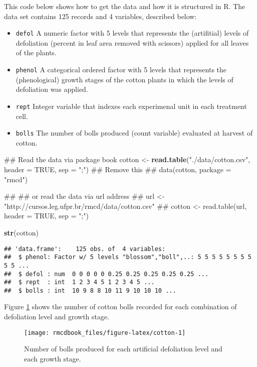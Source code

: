 \documentclass[9pt,a5paper,]{book}
\newenvironment{Shaded}{}{}
\newcommand{\KeywordTok}[1]{\textbf{{#1}}}
\newcommand{\DataTypeTok}[1]{\underline{{#1}}}
\newcommand{\StringTok}[1]{{#1}}
\newcommand{\OtherTok}[1]{{#1}}
\newcommand{\NormalTok}[1]{{#1}}
\renewenvironment{Shaded}{\color{inputcolor}}{}
\renewcommand{\DataTypeTok}[1]{{#1}}
\begin{document}
This code below shows how to get the data and how it is structured in R.
The data set contains 125 records and 4 variables, described below:

\begin{itemize}
\item
  \texttt{defol} A numeric factor with 5 levels that represents the
  (artifitial) levels of defoliation (percent in leaf area removed with
  scissors) applied for all leaves of the plants.
\item
  \texttt{phenol} A categorical ordered factor with 5 levels that
  represents the (phenological) growth stages of the cotton plants in
  which the levels of defoliation was applied.
\item
  \texttt{rept} Integer variable that indexes each experimenal unit in
  each treatment cell.
\item
  \texttt{bolls} The number of bolls produced (count variable) evaluated
  at harvest of cotton.
\end{itemize}

\begin{Shaded}
\begin{Highlighting}[]
\NormalTok{## Read the data via package book}
\NormalTok{cotton <-}\StringTok{ }\KeywordTok{read.table}\NormalTok{(}\StringTok{"./data/cotton.csv"}\NormalTok{, }\DataTypeTok{header =} \OtherTok{TRUE}\NormalTok{,}
                     \DataTypeTok{sep =} \StringTok{";"}\NormalTok{)  ## Remove this}
\NormalTok{## data(cotton, package = "rmcd")}

\NormalTok{## ## or read the data via url address}
\NormalTok{## url <- "http://cursos.leg.ufpr.br/rmcd/data/cotton.csv"}
\NormalTok{## cotton <- read.table(url, header = TRUE, sep = ";")}

\KeywordTok{str}\NormalTok{(cotton)}
\end{Highlighting}
\end{Shaded}

\begin{verbatim}
## 'data.frame':    125 obs. of  4 variables:
##  $ phenol: Factor w/ 5 levels "blossom","boll",..: 5 5 5 5 5 5 5 5 5 5 ...
##  $ defol : num  0 0 0 0 0 0.25 0.25 0.25 0.25 0.25 ...
##  $ rept  : int  1 2 3 4 5 1 2 3 4 5 ...
##  $ bolls : int  10 9 8 8 10 11 9 10 10 10 ...
\end{verbatim}

Figure \ref{fig:cotton} shows the number of cotton bolls recorded for
each combination of defoliation level and growth stage.

\begin{figure}[h]

{\centering \texttt{[image: rmcdbook\_files/figure-latex/cotton-1]} 

}

\caption{Number of bolls produced for each artificial defoliation level and each growth stage.}\label{fig:cotton}
\end{figure}
\end{document}
